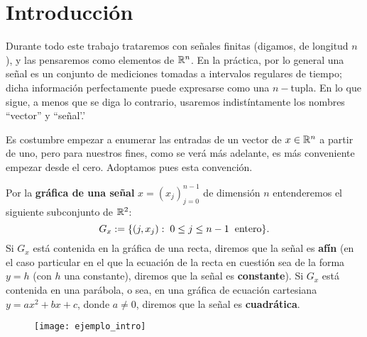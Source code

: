 \chapter{Introducción}
\label{chapter: introduccion}
Durante todo este trabajo trataremos con señales
finitas
(digamos, de
longitud $n$), y las pensaremos como elementos de $\mathbb{R}^{n}$.
En la práctica, por lo general
una señal es un conjunto de mediciones tomadas
a intervalos regulares de tiempo; dicha
información perfectamente puede expresarse como 
una $n-$tupla. En lo que sigue, a menos que se diga
lo contrario, usaremos indistíntamente los nombres
``vector'' y ``señal'.'

Es costumbre empezar
a enumerar las entradas de un vector
de $x \in \mathbb{R}^{n}$ a partir de uno, pero
para nuestros fines,
como se verá más adelante, es más 
conveniente empezar desde el cero.
Adoptamos pues esta convención.


\begin{defi}
\label{def: grafica senial}
Por la \textbf{gráfica de una señal} $x=(x_{j})_{j=0}^{n-1}$
de dimensión $n$ entenderemos
 el siguiente subconjunto de $\mathbb{R}^{2}$:
\[
G_{x} := 
\{ (j, x_{j} ) : \hspace{0.1cm} 0 \leq j \leq n-1
\hspace{0.2cm} \text{entero}\} .
\]
Si $G_{x}$ está contenida en la gráfica de una recta, diremos que la
señal es \textbf{afín}
(en el caso particular en el que
la ecuación de la recta en cuestión sea de la forma $y= h$
(con $h$ una constante),
diremos que la señal es
\textbf{constante}). Si  $G_{x}$ está contenida en 
una parábola, o sea, en una
gráfica de ecuación cartesiana
$y=ax^{2}+ bx +c$, donde $a \neq 0$, diremos 
que la señal es \textbf{cuadrática}.
\end{defi}


\begin{figure}[H]
	\texttt{[image: ejemplo\_intro]} 
 \end{figure}

